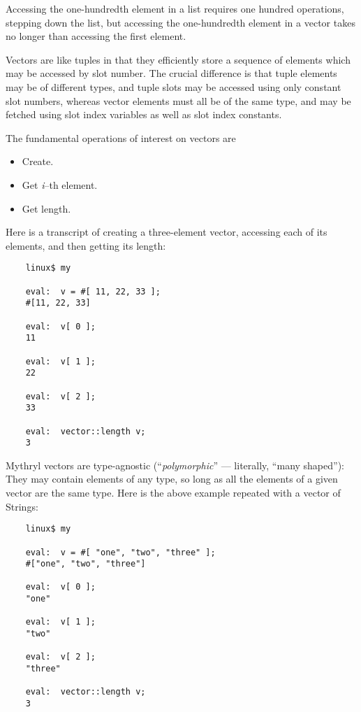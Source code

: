 Accessing the one-hundredth element in a list requires one hundred operations, 
stepping down the list, but accessing the one-hundredth element in a vector takes 
no longer than accessing the first element.

Vectors are like tuples in that they efficiently store a sequence of elements 
which may be accessed by slot number.  The crucial difference is that tuple 
elements may be of different types, and tuple slots may be accessed using 
only constant slot numbers, whereas vector elements must all be of the same 
type, and may be fetched using slot index variables as well as slot index 
constants.

The fundamental operations of interest on vectors are 
\begin{itemize}
\item Create.
\item Get {\it i}--th element.
\item Get length.
\end{itemize}

Here is a transcript of creating a three-element vector, accessing 
each of its elements, and then getting its length:

\begin{verbatim}
    linux$ my

    eval:  v = #[ 11, 22, 33 ];
    #[11, 22, 33]

    eval:  v[ 0 ];
    11

    eval:  v[ 1 ];
    22

    eval:  v[ 2 ];
    33

    eval:  vector::length v;
    3
\end{verbatim}

Mythryl vectors are type-agnostic (``{\it polymorphic}'' --- literally, ``many shaped''):  They may 
contain elements of any type, so long as all the elements of a given vector 
are the same type.  Here is the above example repeated with a vector of Strings: 

\begin{verbatim}
    linux$ my

    eval:  v = #[ "one", "two", "three" ];
    #["one", "two", "three"]

    eval:  v[ 0 ];
    "one"

    eval:  v[ 1 ];
    "two"

    eval:  v[ 2 ];
    "three"

    eval:  vector::length v;
    3
\end{verbatim}

